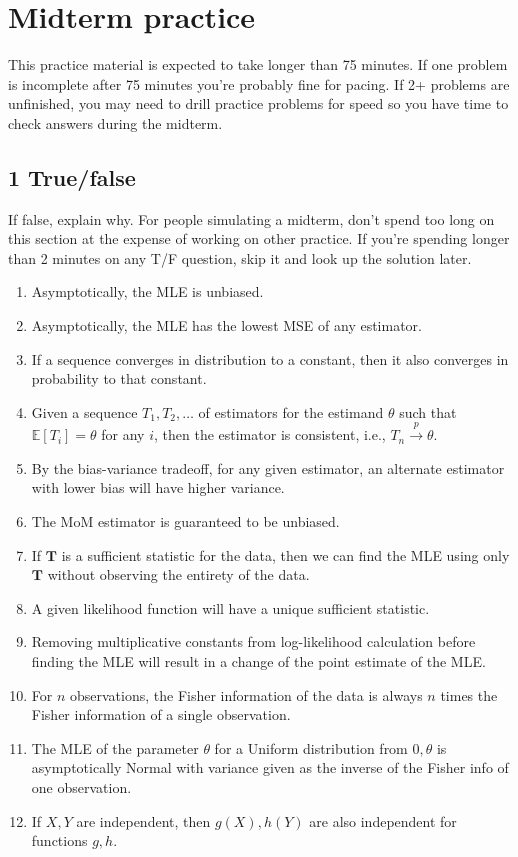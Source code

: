 \documentclass[
]{article}
\author{Al Xin}
\date{2023-03-02}
\providecommand{\tightlist}{%
  \setlength{\itemsep}{0pt}\setlength{\parskip}{0pt}}
\begin{document}
\hypertarget{midterm-practice}{%
\section{Midterm practice}\label{midterm-practice}}

This practice material is expected to take longer than 75 minutes. If
one problem is incomplete after 75 minutes you're probably fine for
pacing. If 2+ problems are unfinished, you may need to drill practice
problems for speed so you have time to check answers during the midterm.

\hypertarget{truefalse}{%
\subsection{1 True/false}\label{truefalse}}

If false, explain why. For people simulating a midterm, don't spend too
long on this section at the expense of working on other practice. If
you're spending longer than 2 minutes on any T/F question, skip it and
look up the solution later.

\begin{enumerate}
\def\labelenumi{\arabic{enumi}.}
\tightlist
\item
  Asymptotically, the MLE is unbiased.
\item
  Asymptotically, the MLE has the lowest MSE of any estimator.
\item
  If a sequence converges in distribution to a constant, then it also
  converges in probability to that constant.
\item
  Given a sequence \(T_1, T_2, \dots\) of estimators for the estimand
  \(\theta\) such that \(\mathbb{E}[T_i] = \theta\) for any \(i\), then
  the estimator is consistent, i.e., \(T_n \overset{p}{\to} \theta\).
\item
  By the bias-variance tradeoff, for any given estimator, an alternate
  estimator with lower bias will have higher variance.
\item
  The MoM estimator is guaranteed to be unbiased.
\item
  If \(\mathbf T\) is a sufficient statistic for the data, then we can
  find the MLE using only \(\mathbf T\) without observing the entirety
  of the data.
\item
  A given likelihood function will have a unique sufficient statistic.
\item
  Removing multiplicative constants from log-likelihood calculation
  before finding the MLE will result in a change of the point estimate
  of the MLE.
\item
  For \(n\) observations, the Fisher information of the data is always
  \(n\) times the Fisher information of a single observation.
\item
  The MLE of the parameter \(\theta\) for a Uniform distribution from
  \(0, \theta\) is asymptotically Normal with variance given as the
  inverse of the Fisher info of one observation.
\item
  If \(X, Y\) are independent, then \(g(X), h(Y)\) are also independent
  for functions \(g, h\).
\end{enumerate}
\end{document}
